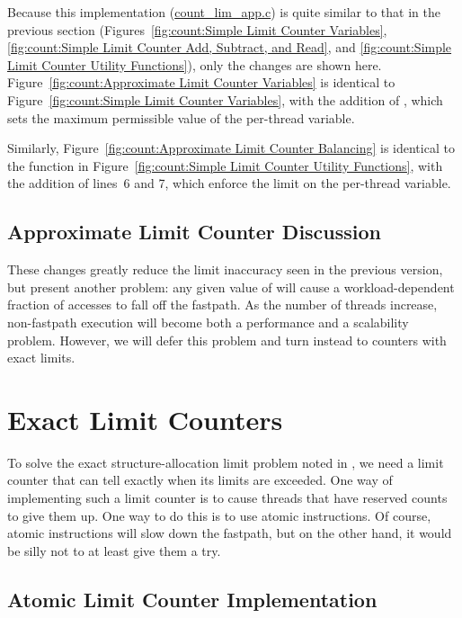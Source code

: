 Because this implementation (\url{count_lim_app.c}) is quite similar to
that in the previous section
(Figures~\ref{fig:count:Simple Limit Counter Variables},
\ref{fig:count:Simple Limit Counter Add, Subtract, and Read}, and
\ref{fig:count:Simple Limit Counter Utility Functions}),
only the changes are shown here.
Figure~\ref{fig:count:Approximate Limit Counter Variables}
is identical to
Figure~\ref{fig:count:Simple Limit Counter Variables},
with the addition of , which sets the maximum
permissible value of the per-thread  variable.

Similarly,
Figure~\ref{fig:count:Approximate Limit Counter Balancing}
is identical to the  function in
Figure~\ref{fig:count:Simple Limit Counter Utility Functions},
with the addition of lines~6 and 7, which enforce the
 limit on the per-thread  variable.

\subsection{Approximate Limit Counter Discussion}

These changes greatly reduce the limit inaccuracy seen in the previous version,
but present another problem: any given value of 
will cause a workload-dependent fraction of accesses to fall off the
fastpath.
As the number of threads increase, non-fastpath execution will become both
a performance and a scalability problem.
However, we will defer this problem and turn instead to counters
with exact limits.

\section{Exact Limit Counters}
\label{sec:count:Exact Limit Counters}

To solve the exact structure-allocation limit problem noted in
{\QQexactcnt},
we need a limit counter that can tell exactly when its limits are
exceeded.
One way of implementing such a limit counter is to
cause threads that have reserved counts to give them up.
One way to do this is to use atomic instructions.
Of course, atomic instructions will slow down the fastpath, but on the
other hand, it would be silly not to at least give them a try.

\subsection{Atomic Limit Counter Implementation}
\label{sec:count:Atomic Limit Counter Implementation}

